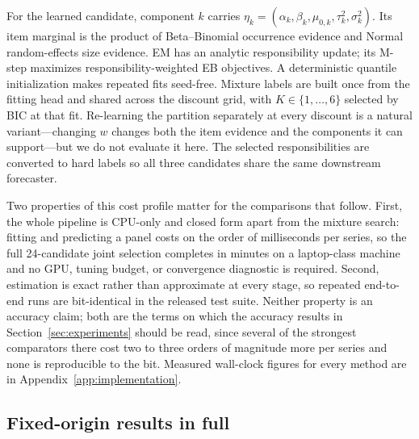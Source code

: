For the learned candidate, component $k$ carries
$\eta_k=(\alpha_k,\beta_k,\mu_{0,k},\tau_k^2,\sigma_k^2)$. Its item
marginal is the product of Beta--Binomial occurrence evidence and Normal
random-effects size evidence. EM has an analytic responsibility update;
its M-step maximizes responsibility-weighted EB objectives. A
deterministic quantile initialization makes repeated fits seed-free.
Mixture labels are built once from the fitting head and shared across the
discount grid, with $K\in\{1,\dots,6\}$ selected by BIC at that fit.
Re-learning the partition separately at every discount is a natural
variant---changing $w$ changes both the item evidence and the components
it can support---but we do not evaluate it here. The
selected responsibilities are converted to hard labels so all three
candidates share the same downstream forecaster.



Two properties of this cost profile matter for the comparisons that
follow. First, the whole pipeline is CPU-only and closed form apart from
the mixture search: fitting and predicting a panel costs on the order of
milliseconds per series, so the full 24-candidate joint selection
completes in minutes on a laptop-class machine and no GPU, tuning budget,
or convergence diagnostic is required. Second, estimation is exact rather
than approximate at every stage, so repeated end-to-end runs are
bit-identical in the released test suite. Neither property is an accuracy
claim; both are the terms on which the accuracy results in
Section~\ref{sec:experiments} should be read, since several of the
strongest comparators there cost two to three orders of magnitude more per
series and none is reproducible to the bit. Measured wall-clock figures
for every method are in Appendix~\ref{app:implementation}.

\subsection{Fixed-origin results in full}
\label{sec:main-results}

